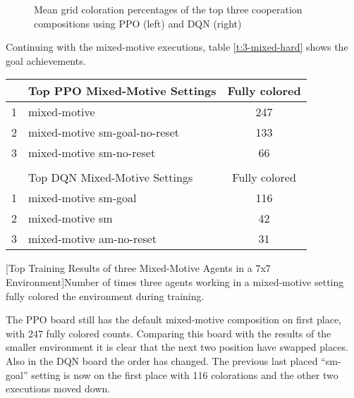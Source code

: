 \begin{figure}[hpbt]
    \centering
    \hspace{0.01\textwidth}
    \caption[Mean Coloration Percentage of the Top Cooperation Modes in a 7x7 Environment]{Mean grid coloration percentages of the top three cooperation compositions using PPO (left) and DQN (right)}
    \label{fig:multipic_plots_coop_hard}
\end{figure}

Continuing with the mixed-motive executions, table \ref{t:3-mixed-hard} shows the goal achievements.

\begin{center}
\begin{tabular}{clc}\hline
      & Top PPO Mixed-Motive Settings & Fully colored \\ \hline
    {\small 1} & mixed-motive & 247 \\
    {\small 2} & mixed-motive sm-goal-no-reset & 133 \\
    {\small 3} & mixed-motive sm-no-reset & 66 \\ \hline
      &   \\ \hline
      & Top DQN Mixed-Motive Settings & Fully colored \\ \hline
    {\small 1} & mixed-motive sm-goal & 116 \\
    {\small 2} & mixed-motive sm & 42 \\
    {\small 3} & mixed-motive am-no-reset & 31 \\ \hline
    \end{tabular}
    [Top Training Results of three Mixed-Motive Agents in a 7x7 Environment]{Number of times three agents working in a mixed-motive setting fully colored the environment during training.}\label{t:3-mixed-hard}
\end{center}

The PPO board still has the default mixed-motive composition on first place, with 247 fully colored counts. Comparing this board with the results of the smaller environment it is clear that the next two position have swapped places. Also in the DQN board the order has changed. The previous last placed ``sm-goal'' setting is now on the first place with 116 colorations and the other two executions moved down. 

